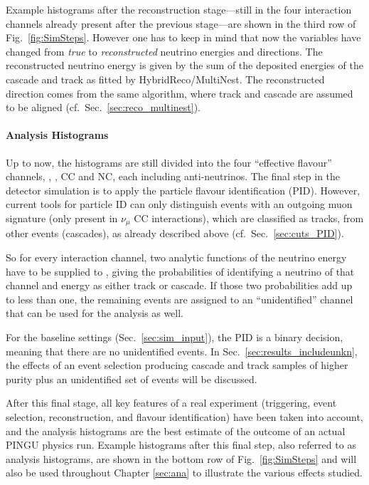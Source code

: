 Example histograms after the reconstruction stage---still in the four
interaction channels already present after the previous stage---are shown in
the third row of Fig.~\ref{fig:SimSteps}. However one has to keep in mind that
now the variables have changed from \emph{true} to \emph{reconstructed}
neutrino energies and directions. The reconstructed neutrino energy is given by
the sum of the deposited energies of the cascade and track as fitted by
HybridReco/MultiNest. The reconstructed direction comes from the same
algorithm, where track and cascade are assumed to be aligned (cf.\
Sec.~\ref{sec:reco_multinest}).

\paragraph{Analysis Histograms}

Up to now, the histograms are still divided into the four ``effective flavour''
channels, \nue, \numu, \nutau CC and \nux NC, each including
anti-neutrinos. The final step in the detector simulation is to apply the
particle flavour identification (PID). However, current tools for particle ID
can only distinguish events with an outgoing muon signature (only present in
$\nu_\mu$ CC interactions), which are classified as tracks, from other events
(cascades), as already described above (cf.\ Sec.~\ref{sec:cuts_PID}).

So for every interaction channel, two analytic functions of the neutrino
energy have to be supplied to \papa, giving the probabilities of identifying a
neutrino of that channel and energy as either track or cascade. If those two
probabilities add up to less than one, the remaining events are assigned to an
``unidentified'' channel that can be used for the analysis as well.

For the baseline settings (Sec.~\ref{sec:sim_input}), the PID is a binary
decision, meaning that there are no unidentified events. In
Sec.~\ref{sec:results_includeunkn}, the effects of an event selection producing
cascade and track samples of higher purity plus an unidentified set of events
will be discussed.

After this final stage, all key features of a real experiment (triggering,
event selection, reconstruction, and flavour identification) have been taken
into account, and the analysis histograms are the best estimate of the outcome
of an actual PINGU physics run. Example histograms after this final step, also
referred to as analysis histograms, are shown in the bottom row of
Fig.~\ref{fig:SimSteps} and will also be used throughout Chapter \ref{sec:ana}
to illustrate the various effects studied.


